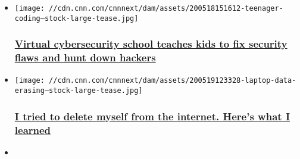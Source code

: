 \begin{itemize}
\item
  \href{/2020/05/20/tech/virtual-cyber-security-school/index.html}{}

  \texttt{[image: //cdn.cnn.com/cnnnext/dam/assets/200518151612-teenager-coding---stock-large-tease.jpg]}

  \hypertarget{virtual-cybersecurity-school-teaches-kids-to-fix-security-flaws-and-hunt-down-hackers}{%
  \subsubsection{\texorpdfstring{\href{/2020/05/20/tech/virtual-cyber-security-school/index.html}{Virtual
  cybersecurity school teaches kids to fix security flaws and hunt down
  hackers}}{Virtual cybersecurity school teaches kids to fix security flaws and hunt down hackers}}\label{virtual-cybersecurity-school-teaches-kids-to-fix-security-flaws-and-hunt-down-hackers}}
\item
  \href{/2020/05/21/tech/deleting-personal-data-online/index.html}{}

  \texttt{[image: //cdn.cnn.com/cnnnext/dam/assets/200519123328-laptop-data-erasing---stock-large-tease.jpg]}

  \hypertarget{i-tried-to-delete-myself-from-the-internet-heres-what-i-learned}{%
  \subsubsection{\texorpdfstring{\href{/2020/05/21/tech/deleting-personal-data-online/index.html}{I
  tried to delete myself from the internet. Here's what I
  learned}}{I tried to delete myself from the internet. Here's what I learned}}\label{i-tried-to-delete-myself-from-the-internet-heres-what-i-learned}}
\item
\end{itemize}


